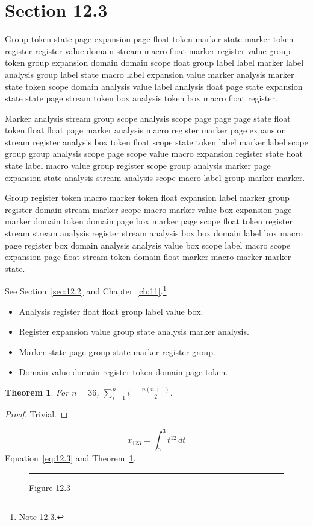 \documentclass[11pt,twoside]{book}
\newtheorem{theorem}{Theorem}[chapter]
\begin{document}
\section{Section 12.3}\label{sec:12.3}
Group token state page expansion page float token marker state marker token register register value domain stream macro float marker register value group token group expansion domain domain scope float group label label marker label analysis group label state macro label expansion value marker analysis marker state token scope domain analysis value label analysis float page state expansion state state page stream token box analysis token box macro float register.

Marker analysis stream group scope analysis scope page page page state float token float float page marker analysis macro register marker page expansion stream register analysis box token float scope state token label marker label scope group group analysis scope page scope value macro expansion register state float state label macro value group register scope group analysis marker page expansion state analysis stream analysis scope macro label group marker marker.

Group register token macro marker token float expansion label marker group register domain stream marker scope macro marker value box expansion page marker domain token domain page box marker page scope float token register stream stream analysis register stream analysis box box domain label box macro page register box domain analysis analysis value box scope label macro scope expansion page float stream token domain float marker macro marker marker state.

See Section~\ref{sec:12.2} and Chapter~\ref{ch:11}.\footnote{Note 12.3.}
\begin{itemize}\item Analysis register float float group label value box.\item Register expansion value group state analysis marker analysis.\item Marker state page group state marker register group.\item Domain value domain register token domain page token.\end{itemize}
\begin{theorem}\label{thm:12.3}For $n=36$, $\sum_{i=1}^{n}i=\frac{n(n+1)}{2}$.\end{theorem}\begin{proof}Trivial.\end{proof}
\begin{equation}x_{123}=\int_0^{3}t^{12}\,dt\label{eq:12.3}\end{equation} Equation~\eqref{eq:12.3} and Theorem~\ref{thm:12.3}.
\begin{figure}[ht]\centering\rule{4cm}{2cm}\caption{Figure 12.3}\label{fig:12.3}\end{figure}
\end{document}
